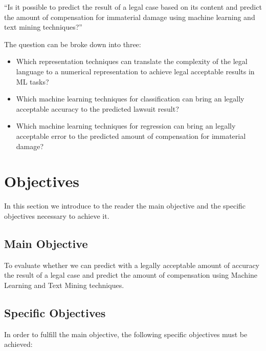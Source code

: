 ``Is it possible to predict the result of a legal case based on its content and predict the amount of compensation for immaterial damage using machine learning and text mining techniques?''

The question can be broke down into three:

\begin{itemize}[noitemsep]
    \item Which representation techniques can translate the complexity of the legal language to a numerical representation to achieve legal acceptable results in ML tasks?
    \item Which machine learning techniques for classification can bring an legally acceptable accuracy to the predicted lawsuit result?
    \item Which machine learning techniques for regression can bring an legally acceptable error to the predicted amount of compensation for immaterial damage?
\end{itemize}

\section{Objectives}

In this section we introduce to the reader the main objective and the specific objectives necessary to achieve it.

\subsection{Main Objective}

To evaluate whether we can predict with a legally acceptable amount of accuracy the result of a legal case and predict the amount of compensation using Machine Learning and Text Mining techniques.

\subsection{Specific Objectives}

In order to fulfill the main objective, the following specific objectives must be achieved:

